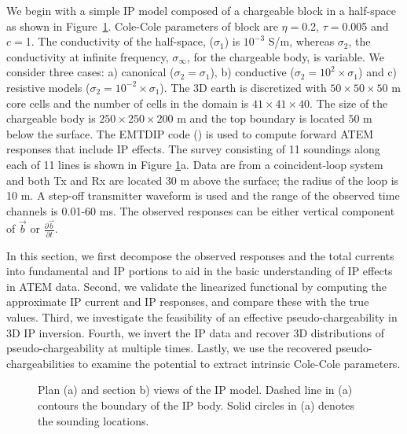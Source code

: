 \documentclass[extra,mreferee]{gji}
\newcommand{\siginf}{\sigma_\infty}
\renewcommand {\b}  { {\vec b} }
\begin{document}
We begin with a simple IP model composed of  a chargeable block in a half-space as shown in Figure~\ref{F: IPModel}.
Cole-Cole parameters of block are  $\eta=$0.2, $\tau=$0.005 and $c=$1.
The conductivity  of the half-space, ($\sigma_1$) is  $10^{-3}$ S/m, whereas $\sigma_2$, 
the conductivity at infinite frequency, $\siginf$,  for the chargeable body, is variable.  
We consider three cases: a) canonical ($\sigma_2=\sigma_1$), b) conductive ($\sigma_2=10^2\times\sigma_1$) and c) resistive models ($\sigma_2=10^{-2}\times\sigma_1$).
The 3D earth is discretized with  $50\times50\times50$ m core cells and the number of cells in the domain is $41\times41\times40$.
The size of the chargeable body is $250\times250\times200$ m and the top boundary is located  $50$ m below the surface.
The EMTDIP code (\cite{Marchant2014}) is used to compute forward ATEM responses that include IP effects. The survey consisting of 11 soundings along each of 11 lines is shown in Figure \ref{F: IPModel}a.
Data are from a  coincident-loop system and both Tx and Rx are located 30 m above the surface; the radius of the loop is 10 m.
A step-off transmitter waveform is used and the range of the observed time channels is 0.01-60 ms. The observed responses can be either vertical component of $\b$ or $\frac{\partial \b}{\partial t}$.

In this section, we first decompose the observed responses and the total currents into fundamental and IP portions to aid in the basic understanding of IP effects in ATEM data. 
Second, we validate the linearized functional by computing the approximate IP current and IP responses, and compare these  with the true values. 
Third, we investigate the feasibility of an effective pseudo-chargeability in 3D IP inversion. 
Fourth, we invert the IP data and recover 3D distributions of pseudo-chargeability at multiple times.  Lastly, we use the recovered pseudo-chargeabilities to examine the potential to extract intrinsic Cole-Cole parameters. 

\begin{figure}
  \caption{Plan (a) and section b) views of the IP model. Dashed line in (a) contours the boundary of the IP body. Solid circles in (a) denotes the sounding locations.}
  \label{F: IPModel}
\end{figure}
\clearpage
\end{document}

